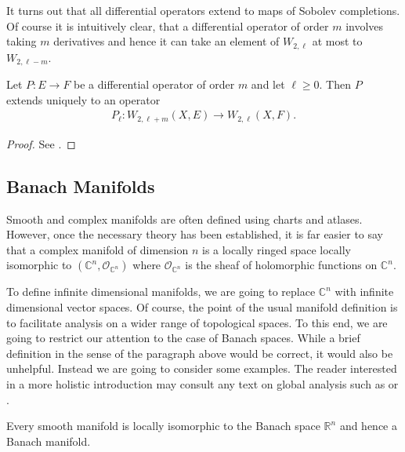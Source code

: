 \documentclass[12pt]{ociamthesis}  %
\begin{document}
It turns out that all differential operators extend to maps of Sobolev
completions. Of course it is intuitively clear, that a differential
operator of order $m$ involves taking $m$ derivatives and hence
it can take an element of $W_{2,\ell}$ at most to $W_{2,\ell-m}$.

\begin{theorem}
  Let $P:E\to F$ be a differential operator of order $m$ and
  let $\ell \geq 0$. Then $P$ extends uniquely to an operator
  \begin{align*}
    P_\ell : W_{2,\ell+m}(X,E) \to W_{2,\ell}(X,F).
  \end{align*}
  \begin{proof}
    See \cite[{Proposition 3.8.4}]{bc2009}.
  \end{proof}
\end{theorem}

\subsection{Banach Manifolds}

Smooth and complex manifolds are often defined using charts and
atlases. However, once the necessary theory has been established,
it is far easier to say that a complex manifold
of dimension $n$ is a locally ringed space locally isomorphic to
$(\mathbb{C}^n,\mathcal O_{\mathbb{C}^n})$ where
$\mathcal O_{\mathbb{C}^n}$ is the sheaf of holomorphic functions on
$\mathbb{C}^n$.

To define infinite dimensional manifolds, we are going to replace
$\mathbb{C}^n$ with infinite dimensional vector spaces. Of course,
the point of the usual manifold definition is to facilitate analysis
on a wider range of topological spaces. To this end, we are going to
restrict our attention to the case of Banach spaces. While a brief
definition in the sense of the paragraph above would be correct,
it would also be unhelpful. Instead we are going to consider some
examples. The reader interested in a more holistic
introduction may consult any text on global analysis such
as \cite[Chapter 7]{kahn1982} or \cite{bc2009}.

\begin{example}
  Every smooth manifold is locally isomorphic to
  the Banach space $\mathbb R^n$ and hence a Banach manifold.
\end{example}
\end{document}
